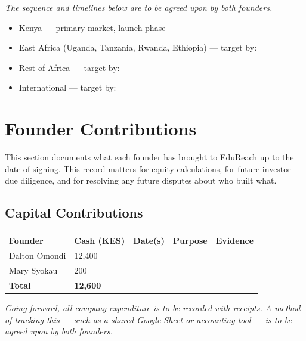 \documentclass[12pt,a4paper]{article}
\newcommand{\blank}[1][5.5cm]{\underline{\hspace{#1}}}
\newcommand{\cb}{$\square$\;}                   %
\begin{document}
\begin{notebox}
\textit{The sequence and timelines below are to be agreed upon by both founders.}
\end{notebox}

\begin{itemize}[label=\cb]
  \item Kenya --- primary market, launch phase
  \item East Africa (Uganda, Tanzania, Rwanda, Ethiopia) --- target by: \blank[4cm]
  \item Rest of Africa --- target by: \blank[4cm]
  \item International --- target by: \blank[4cm]
\end{itemize}

\section{Founder Contributions}

This section documents what each founder has brought to EduReach up to the date of signing. This record matters for equity calculations, for future investor due diligence, and for resolving any future disputes about who built what.

\subsection{Capital Contributions}

\begin{tabularx}{\linewidth}{L{3.2cm} C{2.5cm} C{2cm} L{3cm} L{3cm}}
  \toprule
  \textbf{Founder} & \textbf{Cash (KES)} & \textbf{Date(s)} & \textbf{Purpose} & \textbf{Evidence} \\
  \midrule
  Dalton Omondi & 12{,}400 & \blank[1.2cm] & \blank[2.5cm] & \blank[2.5cm] \\[0.4em]
  Mary Syokau   & 200      & \blank[1.2cm] & \blank[2.5cm] & \blank[2.5cm] \\[0.4em]
  \midrule
  \textbf{Total} & \textbf{12{,}600} & & & \\
  \bottomrule
\end{tabularx}

\medskip
\begin{notebox}
\textit{Going forward, all company expenditure is to be recorded with receipts. A method of tracking this --- such as a shared Google Sheet or accounting tool --- is to be agreed upon by both founders.}
\end{notebox}
\end{document}
